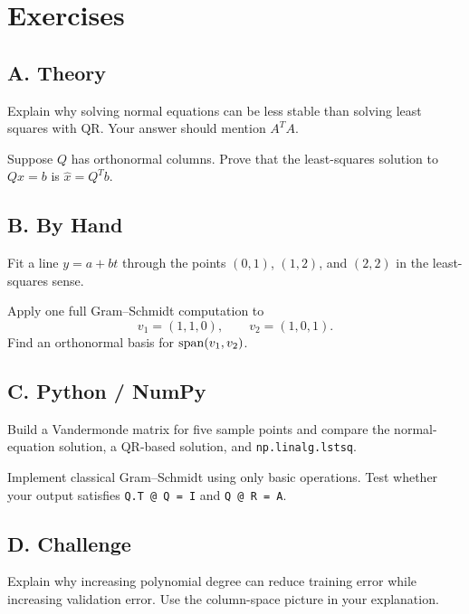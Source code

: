 \section*{Exercises}

\subsection*{A. Theory}

\begin{exercise}
Explain why solving normal equations can be less stable than solving least
squares with QR. Your answer should mention $A^TA$.
\end{exercise}

\begin{exercise}
Suppose $Q$ has orthonormal columns. Prove that the least-squares solution to
$Qx=b$ is $\hat{x}=Q^Tb$.
\end{exercise}

\subsection*{B. By Hand}

\begin{exercise}
Fit a line $y=a+bt$ through the points $(0,1)$, $(1,2)$, and $(2,2)$ in the
least-squares sense.
\end{exercise}

\begin{exercise}
Apply one full Gram--Schmidt computation to
\[
  v_1=(1,1,0),\qquad v_2=(1,0,1).
\]
Find an orthonormal basis for $\operatorname{span}(v_1,v_2)$.
\end{exercise}

\subsection*{C. Python / NumPy}

\begin{exercise}
Build a Vandermonde matrix for five sample points and compare the
normal-equation solution, a QR-based solution, and
\texttt{np.linalg.lstsq}.
\end{exercise}

\begin{exercise}
Implement classical Gram--Schmidt using only basic \NumPy operations. Test
whether your output satisfies \texttt{Q.T @ Q = I} and \texttt{Q @ R = A}.
\end{exercise}

\subsection*{D. Challenge}

\begin{exercise}
Explain why increasing polynomial degree can reduce training error while
increasing validation error. Use the column-space picture in your explanation.
\end{exercise}
